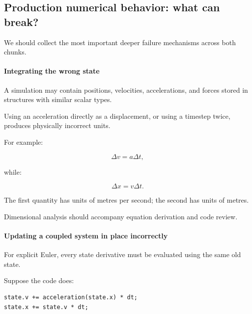 \subsection{Production numerical behavior: what can break?}\label{02-foundations-ii-ch022-production-numerical-behavior-what-can-break}

\hypertarget{02-foundations-ii-ch022-production-numerical-behavior-what-can-break}{}

We should collect the most important deeper failure mechanisms across both chunks.

\paragraph{Integrating the wrong state}\label{02-foundations-ii-ch022-integrating-the-wrong-state}

\hypertarget{02-foundations-ii-ch022-integrating-the-wrong-state}{}

A simulation may contain positions, velocities, accelerations, and forces stored in structures with similar scalar types.

Using an acceleration directly as a displacement, or using a timestep twice, produces physically incorrect units.

For example:

\[
\Delta v=a\Delta t,
\]

while:

\[
\Delta x=v\Delta t.
\]

The first quantity has units of metres per second; the second has units of metres.

Dimensional analysis should accompany equation derivation and code review.

\paragraph{Updating a coupled system in place incorrectly}\label{02-foundations-ii-ch022-updating-a-coupled-system-in-place-incorrectly}

\hypertarget{02-foundations-ii-ch022-updating-a-coupled-system-in-place-incorrectly}{}

For explicit Euler, every state derivative must be evaluated using the same old state.

Suppose the code does:

\begin{verbatim}
state.v += acceleration(state.x) * dt;
state.x += state.v * dt;
\end{verbatim}

